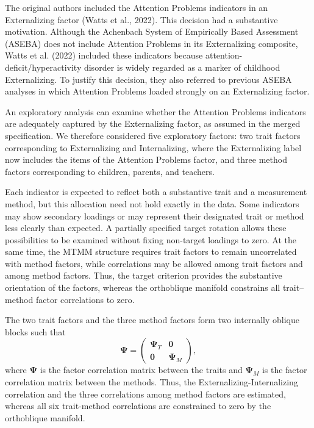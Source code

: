\documentclass[
  12pt,
  letterpaper,
  article]{scrartcl}
\begin{document}
The original authors included the Attention Problems indicators in an
Externalizing factor (Watts et al., 2022). This decision had a
substantive motivation. Although the Achenbach System of Empirically
Based Assessment (ASEBA) does not include Attention Problems in its
Externalizing composite, Watts et al. (2022) included these indicators
because attention-deficit/hyperactivity disorder is widely regarded as a
marker of childhood Externalizing. To justify this decision, they also
referred to previous ASEBA analyses in which Attention Problems loaded
strongly on an Externalizing factor.

An exploratory analysis can examine whether the Attention Problems
indicators are adequately captured by the Externalizing factor, as
assumed in the merged specification. We therefore considered five
exploratory factors: two trait factors corresponding to Externalizing
and Internalizing, where the Externalizing label now includes the items
of the Attention Problems factor, and three method factors corresponding
to children, parents, and teachers.

Each indicator is expected to reflect both a substantive trait and a
measurement method, but this allocation need not hold exactly in the
data. Some indicators may show secondary loadings or may represent their
designated trait or method less clearly than expected. A partially
specified target rotation allows these possibilities to be examined
without fixing non-target loadings to zero. At the same time, the MTMM
structure requires trait factors to remain uncorrelated with method
factors, while correlations may be allowed among trait factors and among
method factors. Thus, the target criterion provides the substantive
orientation of the factors, whereas the orthoblique manifold constrains
all trait--method factor correlations to zero.

The two trait factors and the three method factors form two internally
oblique blocks such that \[
\boldsymbol{\Psi}=
\begin{pmatrix}
\boldsymbol{\Psi}_{T} & \mathbf{0}\\
\mathbf{0} & \boldsymbol{\Psi}_{M}
\end{pmatrix},
\] where \(\boldsymbol{\Psi}\) is the factor correlation matrix between
the traits and \(\boldsymbol{\Psi}_{M}\) is the factor correlation
matrix between the methods. Thus, the Externalizing-Internalizing
correlation and the three correlations among method factors are
estimated, whereas all six trait-method correlations are constrained to
zero by the orthoblique manifold.
\end{document}
